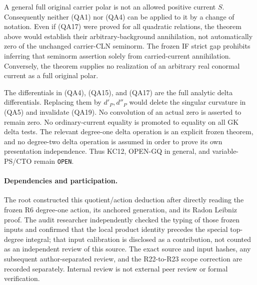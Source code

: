 A general full original carrier polar is not an allowed positive
current $S$.  Consequently neither (QA1) nor (QA4) can be applied
to it by a change of notation.  Even if (QA17) were proved for
all quadratic relations, the theorem above would establish their
arbitrary-background annihilation, not automatically zero of the
unchanged carrier-CLN seminorm.  The frozen IF strict gap prohibits
inferring that seminorm assertion solely from carried-current
annihilation.  Conversely, the theorem supplies no realization of
an arbitrary real conormal current as a full original polar.

The differentials in (QA4), (QA15), and (QA17) are the full analytic
delta differentials.  Replacing them by $d'_P,d''_P$ would delete
the singular curvature in (QA5) and invalidate (QA19).  No
convolution of an actual zero is asserted to remain zero.  No
ordinary-current equality is promoted to equality on all GK delta
tests.  The relevant degree-one delta operation is an explicit
frozen theorem, and no degree-two delta operation is assumed in
order to prove its own presentation independence.  Thus KC12,
OPEN-GQ in general, and variable-PS/CTO remain \texttt{OPEN}.

\paragraph{Dependencies and participation.}
The root constructed this quotient/action deduction after directly
reading the frozen R6 degree-one action, its anchored generation,
and its Radon Leibniz proof.  The audit researcher independently
checked the typing of those frozen inputs and confirmed that the
local product identity precedes the special top-degree integral;
that input calibration is disclosed as a contribution, not counted
as an independent review of this source.  The exact source and input
hashes, any subsequent author-separated review, and the R22-to-R23
scope correction are recorded separately.  Internal review is not
external peer review or formal verification.
